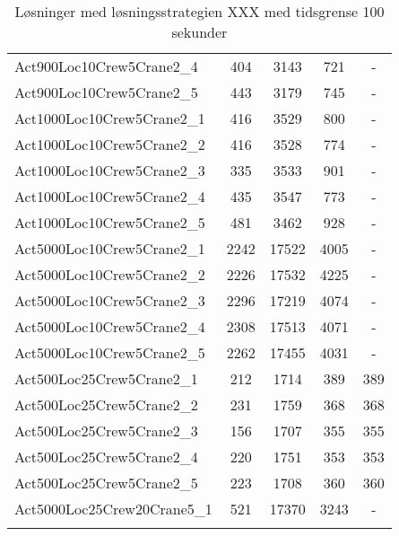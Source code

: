 \begin{center}
\begin{longtable}{ | l | c | c | c | c | }
Act900Loc10Crew5Crane2\_4	&	404	&	3143	&	721	&	-	\\	
Act900Loc10Crew5Crane2\_5	&	443	&	3179	&	745	&	-	\\
Act1000Loc10Crew5Crane2\_1	&	416	&	3529	&	800	&	-	\\	
Act1000Loc10Crew5Crane2\_2	&	416	&	3528	&	774	&	-	\\	
Act1000Loc10Crew5Crane2\_3	&	335	&	3533	&	901	&	-	\\	
Act1000Loc10Crew5Crane2\_4	&	435	&	3547	&	773	&	-	\\	
Act1000Loc10Crew5Crane2\_5	&	481	&	3462	&	928	&	-	\\
Act5000Loc10Crew5Crane2\_1	&	2242	&	17522	&	4005	&	-	\\	
Act5000Loc10Crew5Crane2\_2	&	2226	&	17532	&	4225	&	-	\\	
Act5000Loc10Crew5Crane2\_3	&	2296	&	17219	&	4074	&	-	\\	
Act5000Loc10Crew5Crane2\_4	&	2308	&	17513	&	4071	&	-	\\	
Act5000Loc10Crew5Crane2\_5	&	2262	&	17455	&	4031	&	-	\\		
Act500Loc25Crew5Crane2\_1	&	212	&	1714	&	389	&	389	\\	
Act500Loc25Crew5Crane2\_2	&	231	&	1759	&	368	&	368	\\	
Act500Loc25Crew5Crane2\_3	&	156	&	1707	&	355	&	355	\\	
Act500Loc25Crew5Crane2\_4	&	220	&	1751	&	353	&	353	\\	
Act500Loc25Crew5Crane2\_5	&	223	&	1708	&	360	&	360	\\	
Act5000Loc25Crew20Crane5\_1	&	521	&	17370	&	3243	&	-	\\	
\hline									
\caption{Løsninger med løsningsstrategien XXX med tidsgrense 100 sekunder}										
\label{tab:solutionAssignAltRFSTF100s}					
\end{longtable}									
\end{center}									
